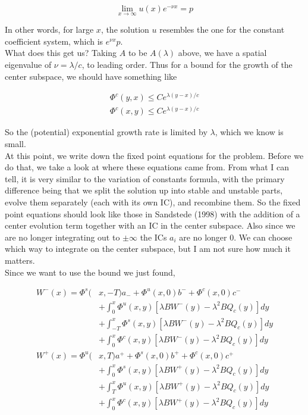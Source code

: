 \documentclass[12pt]{article}
\begin{document}
\[
\lim_{x\rightarrow\infty} u(x) e^{-\nu x} = p
\]

In other words, for large $x$, the solution $u$ resembles the one for the constant coefficient system, which is $e^{\nu x} p$.\\

What does this get us? Taking $A$ to be $A(\lambda)$ above, we have a spatial eigenvalue of $\nu = \lambda / c$, to leading order. Thus for a bound for the growth of the center subspace, we should have something like

\begin{align*}
\Phi^c(y, x) \leq C e^{\lambda(y-x)/c} \\
\Phi^c(x, y) \leq C e^{\lambda(y-x)/c}
\end{align*}

So the (potential) exponential growth rate is limited by $\lambda$, which we know is small.\\

At this point, we write down the fixed point equations for the problem. Before we do that, we take a look at where these equations came from. From what I can tell, it is very similar to the variation of constants formula, with the primary difference being that we split the solution up into stable and unstable parts, evolve them separately (each with its own IC), and recombine them. So the fixed point equations should look like those in Sandstede (1998) with the addition of a center evolution term together with an IC in the center subspace. Also since we are no longer integrating out to $\pm \infty$ the ICs $a_i$ are no longer 0. We can choose which way to integrate on the center subspace, but I am not sure how much it matters. \\

Since we want to use the bound we just found, 

\begin{align*}
W^-(x) = \Phi^s(&x, -T)a_- + \Phi^u(x, 0)b^- + \Phi^c(x, 0)c^- \\
&+ \int_0^x \Phi^u(x, y)[\lambda B W^-(y) - \lambda^2 B Q_c(y) ] dy \\
&+ \int_{-T}^x \Phi^s(x, y)[\lambda B W^-(y) - \lambda^2 B Q_c(y) ] dy \\
&+ \int_0^x \Phi^c(x, y)[\lambda B W^-(y) - \lambda^2 B Q_c(y) ] dy \\
W^+(x) = \Phi^u(&x, T)a^+ + \Phi^s(x, 0)b^+ + \Phi^c(x, 0)c^+ \\
&+ \int_0^x \Phi^s(x, y)[\lambda B W^+(y) - \lambda^2 B Q_c(y) ] dy \\
&+ \int_T^x \Phi^u(x, y)[\lambda B W^+(y) - \lambda^2 B Q_c(y) ]dy \\
&+ \int_0^x \Phi^c(x, y)[\lambda B W^+(y) - \lambda^2 B Q_c(y) ] dy
\end{align*}
\end{document}
